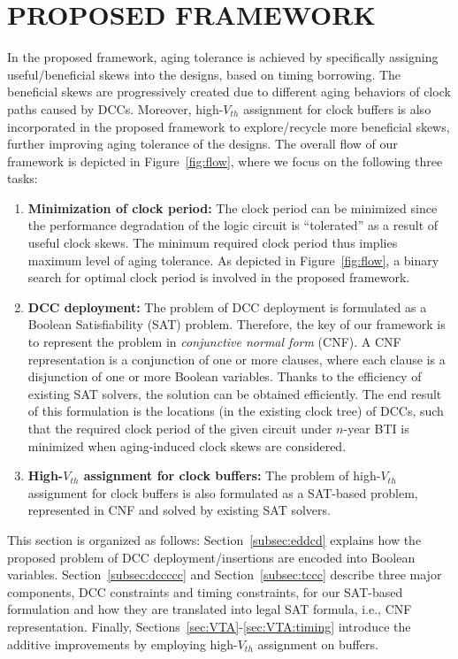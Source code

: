 \section{PROPOSED FRAMEWORK}
\label{sec:framework}
In the proposed framework, aging tolerance is achieved by specifically assigning useful/beneficial skews into the designs, based on timing borrowing. The beneficial skews are progressively created due to different aging behaviors of clock paths caused by DCCs. Moreover, high-$V_{th}$ assignment for clock buffers is also incorporated in the proposed framework to explore/recycle more beneficial skews, further improving aging tolerance of the designs.
The overall flow of our framework is depicted in Figure~\ref{fig:flow}, where we focus on the following three tasks:
\begin{enumerate}[leftmargin=*]
	\item \textbf{Minimization of clock period:} The clock period can be minimized since the performance degradation of the logic circuit is \enquote{tolerated} as a result of useful clock skews. The minimum required clock period thus implies maximum level of aging tolerance. As depicted in Figure~\ref{fig:flow}, a binary search for optimal clock period is involved in the proposed framework.
	\item \textbf{DCC deployment:} The problem of  DCC deployment is formulated as a Boolean Satisfiability (SAT) problem. Therefore, the key of our framework is to represent the problem in \textit{conjunctive normal form} (CNF). A CNF representation is a conjunction of one or more clauses, where each clause is a disjunction of one or more Boolean variables. Thanks to the efficiency of existing SAT solvers, the solution can be obtained efficiently. The end result of this formulation is the locations (in the existing clock tree) of DCCs, such that the required clock period of the given circuit under $n$-year BTI is minimized when aging-induced clock skews are considered. 
	\item \textbf{High-$V_{th}$ assignment for clock buffers:} The problem of high-$V_{th}$ assignment for clock buffers is also formulated as a SAT-based problem, represented in CNF and solved by existing SAT solvers.
\end{enumerate}


 

This section is organized as follows: Section~\ref{subsec:eddcd} explains how the proposed problem of DCC deployment/insertions are encoded into Boolean variables. Section~\ref{subsec:dccccc} and Section~\ref{subsec:tccc} describe three major components, DCC constraints and timing constraints, for our SAT-based formulation and how they are translated into legal SAT formula, i.e., CNF representation. Finally, Sections~\ref{sec:VTA}-\ref{sec:VTA:timing} introduce the additive improvements by employing high-$V_{th}$ assignment on buffers.

